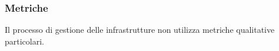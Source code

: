 \subsubsection{Metriche}
Il processo di gestione delle infrastrutture non utilizza metriche qualitative particolari.